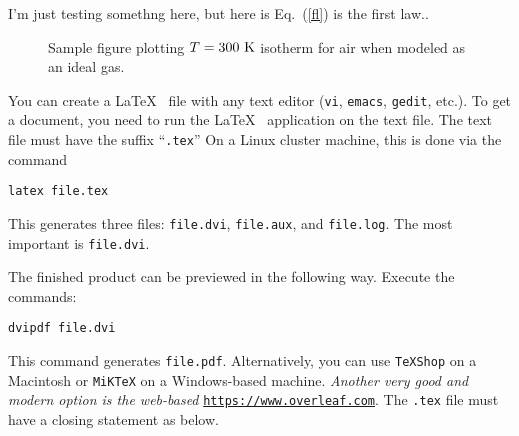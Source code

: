 \documentclass{article}
\begin{document}
I'm just testing somethng here, but here is Eq.~(\ref{fl}) is the first law..
\begin{figure}[ht]
\epsfxsize=2.5in
\centerline{}
\caption{Sample figure plotting $T=300~{\rm K}$ isotherm for air when modeled as an ideal gas.}
\label{sample}
\end{figure}

\medskip
{}
\medskip

You can create a \LaTeX~ file with any text editor ({\tt vi}, {\tt emacs}, {\tt gedit}, 
etc.). 
To get a document, you need to run the \LaTeX~ application
on the text file.  The text file must have the suffix ``{\tt .tex}''
On a Linux cluster machine, this is done via the command

\medskip
{\tt latex file.tex}

\medskip
\noindent
This generates three files: {\tt file.dvi}, {\tt file.aux},
and {\tt file.log}.  The most important is {\tt file.dvi}. 

\medskip
\noindent
The finished product can be previewed in the following way.
Execute the commands:

\medskip

{\tt dvipdf file.dvi}\hspace{1.9in}{\em Linux System}

\medskip
\noindent
This command generates {\tt file.pdf}.  
Alternatively, you can use {\tt TeXShop} on a Macintosh or {\tt MiKTeX} on a Windows-based machine. {\em Another very good and modern option is the web-based} \href{https://www.overleaf.com}{\tt https://www.overleaf.com}.
The {\tt .tex} file must have a closing statement as
below.
\end{document}
